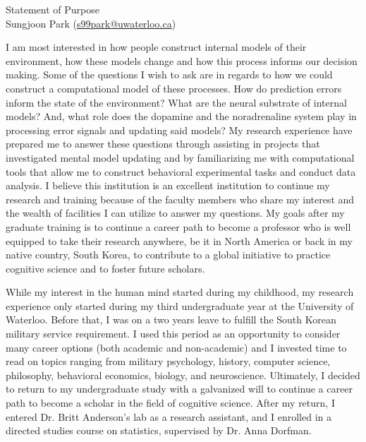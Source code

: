 \documentclass[12pt]{article}
\let\oldcenter\center
\let\oldendcenter\endcenter
\renewenvironment{center}{\setlength\topsep{-1pt}\oldcenter}{\oldendcenter}
\begin{document}
	
	\begin{center}
		{\Large Statement of Purpose} \\
		{\normalsize Sungjoon Park (\href{mailto:s99park@uwaterloo.ca}{s99park@uwaterloo.ca})}
	\end{center}
	
	I am most interested in how people construct internal models of their environment, how these models change and how this process informs our decision making. Some of the questions I wish to ask are in regards to how we could construct a computational model of these processes. How do prediction errors inform the state of the environment? What are the neural substrate of internal models? And, what role does the dopamine and the noradrenaline system play in processing error signals and updating said models? My research experience have prepared me to answer these questions through assisting in projects that investigated mental model updating and by familiarizing me with computational tools that allow me to construct behavioral experimental tasks and conduct data analysis. I believe this institution is an excellent institution to continue my research and training because of the faculty members who share my interest and the wealth of facilities I can utilize to answer my questions. My goals after my graduate training is to continue a career path to become a professor who is well equipped to take their research anywhere, be it in North America or back in my native country, South Korea, to contribute to a global initiative to practice cognitive science and to foster future scholars.
	
	While my interest in the human mind started during my childhood, my research experience only started during my third undergraduate year at the University of Waterloo. Before that, I was on a two years leave to fulfill the South Korean military service requirement. I used this period as an opportunity to consider many career options (both academic and non-academic) and I invested time to read on topics ranging from military psychology, history, computer science, philosophy, behavioral economics, biology, and neuroscience. Ultimately, I decided to return to my undergraduate study with a galvanized will to continue a career path to become a scholar in the field of cognitive science. After my return, I entered Dr. Britt Anderson’s lab as a research assistant, and I enrolled in a directed studies course on statistics, supervised by Dr. Anna Dorfman.
	
\end{document}

